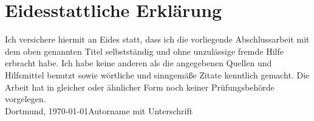 \newpage
\thispagestyle{empty}
\section*{Eidesstattliche Erklärung}
\thispagestyle{empty}
Ich versichere hiermit an Eides statt, dass ich die vorliegende Abschlussarbeit mit dem oben genannten Titel selbstständig und ohne unzulässige fremde Hilfe erbracht habe. Ich habe keine anderen als die angegebenen Quellen und Hilfsmittel benutzt sowie wörtliche und sinngemäße Zitate kenntlich gemacht. Die Arbeit hat in gleicher oder ähnlicher Form noch keiner Prüfungsbehörde vorgelegen.
\vspace{4\baselineskip}\\
Dortmund, \today \hfill Autorname mit Unterschrift
\vspace{4\baselineskip}\\
